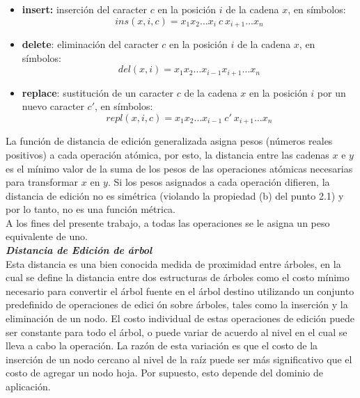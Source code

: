 \begin{itemize}
\item \textbf{insert:} inserci\'on del caracter $c$ en la posici\'on $i$
de la cadena $x$, en s\'imbolos: 
\[ins(x,i,c)=x_1 x_2 \ldots x_i\ c\ x_{i+1} \ldots x_n\]
 
\item  \textbf{delete}: eliminaci\'on del caracter $c$ en la posici\'on 
$i$ de la cadena $x$, en s\'imbolos:
  \[ del(x,i)=x_1 x_2 \ldots x_{i-1} x_{i+1} \ldots x_n\]
  
  
\item \textbf{replace}: sustituci\'on de un caracter $c$ de la cadena $x$ en 
la posici\'on $i$ por un nuevo caracter $c'$, en s\'imbolos:
\[repl(x,i,c)=x_1 x_2 \ldots x_{i-1}\ c' \ x_{i+1} \ldots x_n\]
\end{itemize}


La funci\'on de distancia de edici\'on generalizada asigna pesos (n\'umeros reales positivos) a 
cada operaci\'on at\'omica, por esto, la distancia entre las cadenas $x$ e $y$ es el m\'inimo 
valor de la suma de los pesos de las operaciones at\'omicas necesarias para transformar $x$ en $y
$. Si los pesos asignados a cada operaci\'on difieren, la distancia de edici\'on no es sim\'etrica 
(violando la propiedad (b) del punto 2.1) y por lo tanto, no es una funci\'on m\'etrica.\\


A los fines del presente trabajo, a todas las operaciones se le asigna un peso equivalente de uno.\\

\noindent \textbf{\textit{Distancia de Edici\'on de \'arbol}}\\

Esta distancia es una bien conocida medida de proximidad entre \'arboles, en la cual se define la 
distancia entre dos estructuras de \'arboles como el costo m\'inimo necesario para convertir el 
\'arbol fuente en el \'arbol destino utilizando un conjunto predefinido de operaciones de edici
\'on sobre \'arboles, tales como la inserci\'on y la eliminaci\'on de un nodo. El costo individual 
de estas operaciones de edici\'on puede ser constante para todo el \'arbol, o puede variar de 
acuerdo al nivel en el cual se lleva a cabo la operaci\'on. La raz\'on de esta variaci\'on es que 
el costo de la inserci\'on de un nodo cercano al nivel de la ra\'iz puede ser m\'as significativo 
que el costo de agregar un nodo hoja. Por supuesto, esto depende del dominio de aplicaci\'on.\\

